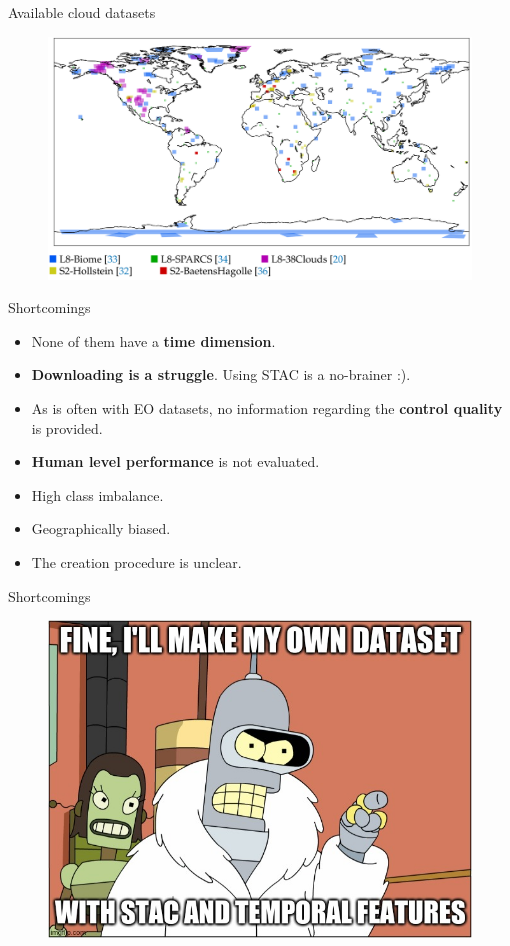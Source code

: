 \documentclass{beamer}
\begin{document}
\begin{frame}{Available cloud datasets}
\begin{figure}
	\centering
	\includegraphics[width=0.75\linewidth]{images/figure_02}
\end{figure}
\end{frame}


\begin{frame}{Shortcomings}
\begin{itemize}
	\item None of them have a \textbf{time dimension}.
	\item \textbf{Downloading is a struggle}. Using STAC is a no-brainer :).
	\item As is often with EO datasets, no information regarding the \textbf{control quality} is provided.
	\item \textbf{Human level performance} is not evaluated.		
	\item High class imbalance.
	\item Geographically biased.
	\item The creation procedure is unclear.	
\end{itemize}
\end{frame}



\begin{frame}{Shortcomings}
\begin{figure}
	\centering
	\includegraphics[width=0.65\linewidth]{images/figure04}
	\label{fig:figure04}
\end{figure}
\end{frame}
\end{document}
